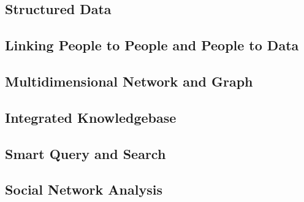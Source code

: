 \subsection{Structured Data}
\subsection{Linking People to People and People to Data}
\subsection{Multidimensional Network and Graph}
\subsection{Integrated Knowledgebase}
\subsection{Smart Query and Search}
\subsection{Social Network Analysis}